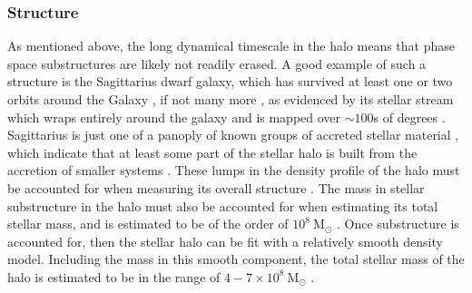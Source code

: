 \subsubsection{Structure}
As mentioned above, the long dynamical timescale in the halo means that phase space substructures are likely not readily erased. A good example of such a structure is the Sagittarius dwarf galaxy, which has survived at least one or two orbits around the Galaxy \citep[e.g.]{1999AJ....118.1719J}, if not many more \citep[e.g.][]{1997AJ....113..634I}, as evidenced by its stellar stream which wraps entirely around the galaxy and is mapped over $\sim 100$s of degrees \citep[e.g.][]{2003ApJ...596L.191N,2004AJ....128..245M,2006ApJ...642L.137B,2009ApJ...700.1282Y}. Sagittarius is just one of a panoply of known groups of accreted stellar material \citep[see e.g.][for a review]{2013NewAR..57..100B}, which indicate that at least some part of the stellar halo is built from the accretion of smaller systems \citep[as predicted in the seminal work of][which I discuss further in Section \ref{sec:galacticarchaeology}]{1978ApJ...225..357S}. These lumps in the density profile of the halo must be accounted for when measuring its overall structure \citep[e.g.][]{2011MNRAS.416.2903D}. The mass in stellar substructure in the halo must also be accounted for when estimating its total stellar mass, and is estimated to be of the order of $10^8\ \mathrm{M_{\odot}}$ \citep[based on a recent review by][]{2016ARA&A..54..529B}. Once substructure is accounted for, then the stellar halo can be fit with a relatively smooth density model. Including the mass in this smooth component, the total stellar mass of the halo is estimated to be in the range of $4-7\times 10^{8}\ \mathrm{M_{\odot}}$ \citep{2016ARA&A..54..529B}.

